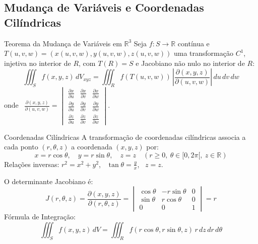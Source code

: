 \documentclass[11pt,a4paper]{article}
\newcommand{\R}{\mathbb{R}}
\begin{document}
\subsection{Mudança de Variáveis e Coordenadas Cilíndricas}

\begin{theorembox}{Teorema da Mudança de Variáveis em $\R^3$}
  Seja $f: S \to \R$ contínua e $T(u,v,w) = (x(u,v,w), y(u,v,w), z(u,v,w))$ uma transformação $C^1$, injetiva no interior de $R$, com $T(R)=S$ e Jacobiano não nulo no interior de $R$:
  \[ \iiint_S f(x,y,z) \, dV_{xyz} = \iiint_R f(T(u,v,w)) \, \left| \frac{\partial(x,y,z)}{\partial(u,v,w)} \right| \, du \, dv \, dw \]
  onde \ $\frac{\partial(x,y,z)}{\partial(u,v,w)} = \begin{vmatrix} \frac{\partial x}{\partial u} & \frac{\partial x}{\partial v} & \frac{\partial x}{\partial w} \\ \frac{\partial y}{\partial u} & \frac{\partial y}{\partial v} & \frac{\partial y}{\partial w} \\ \frac{\partial z}{\partial u} & \frac{\partial z}{\partial v} & \frac{\partial z}{\partial w} \end{vmatrix}$.
\end{theorembox}

\begin{definitionbox}{Coordenadas Cilíndricas}
  A transformação de coordenadas cilíndricas associa a cada ponto $(r, \theta, z)$ a coordenada $(x,y,z)$ por:
  \[ x = r\cos\theta, \quad y = r\sin\theta, \quad z = z \quad (r \ge 0, \ \theta \in [0, 2\pi[, \ z \in \R) \]
  Relações inversas: $r^2 = x^2 + y^2$, \ $\tan\theta = \frac{y}{x}$, \ $z = z$.
  
  O determinante Jacobiano é:
  \[ J(r, \theta, z) = \frac{\partial(x,y,z)}{\partial(r,\theta,z)} = \begin{vmatrix} \cos\theta & -r\sin\theta & 0 \\ \sin\theta & r\cos\theta & 0 \\ 0 & 0 & 1 \end{vmatrix} = r \]
  Fórmula de Integração:
  \[ \iiint_S f(x,y,z) \, dV = \iiint_R f(r\cos\theta, r\sin\theta, z) \, r \, dz \, dr \, d\theta \]
\end{definitionbox}
\end{document}
